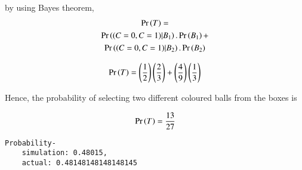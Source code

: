 \documentclass[journal,12pt,twocolumn]{IEEEtran}
\begin{document}
by using Bayes theorem,
\begin{multline}
    \Pr\left(T\right)=\\
    \Pr\left((C=0,C=1)|B_1\right).\Pr\left(B_1\right)+\\
    \Pr\left((C=0,C=1)|B_2\right).\Pr\left(B_2\right)
\end{multline}

\begin{align}
    \Pr\left(T\right)=\left(\frac{1}{2}\right)\left(\frac{2}{3}\right)+\left(\frac{4}{9}\right)\left(\frac{1}{3}\right)
\end{align}

Hence, the probability of selecting two different coloured balls from the boxes is

\begin{align}
    \Pr\left(T\right)=\frac{13}{27}
\end{align}

\begin{lstlisting}
Probability-
    simulation: 0.48015,
    actual: 0.48148148148148145
\end{lstlisting}
\end{document}
